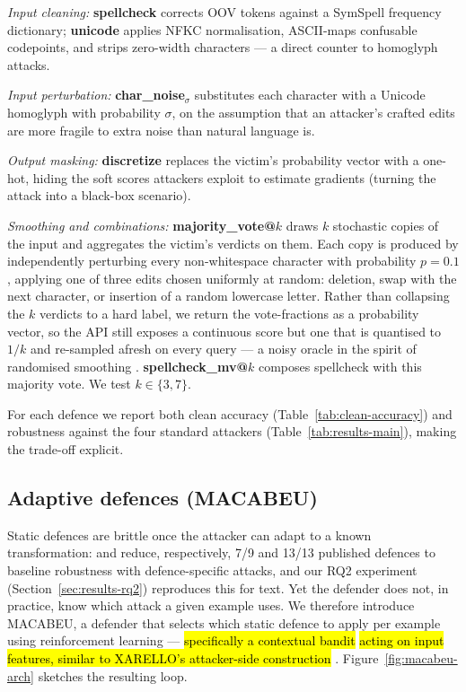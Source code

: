 \documentclass[11pt]{article}
\begin{document}
\emph{Input cleaning:} \textbf{spellcheck} corrects OOV tokens against a SymSpell frequency dictionary; \textbf{unicode} applies NFKC normalisation, ASCII-maps confusable codepoints, and strips zero-width characters --- a direct counter to homoglyph attacks.

\emph{Input perturbation:} \textbf{char\_noise}$_\sigma$ substitutes each character with a Unicode homoglyph with probability $\sigma$, on the assumption that an attacker's crafted edits are more fragile to extra noise than natural language is.

\emph{Output masking:} \textbf{discretize} replaces the victim's probability vector with a one-hot, hiding the soft scores attackers exploit to estimate gradients (turning the attack into a black-box scenario).


\emph{Smoothing and combinations:} \textbf{majority\_vote@$k$} draws $k$ stochastic copies of the input and aggregates the victim's verdicts on them. Each copy is produced by independently perturbing every non-whitespace character with probability $p{=}0.1$, applying one of three edits chosen uniformly at random: deletion, swap with the next character, or insertion of a random lowercase letter. Rather than collapsing the $k$ verdicts to a hard label, we return the vote-fractions as a probability vector, so the API still exposes a continuous score but one that is quantised to $1/k$ and re-sampled afresh on every query --- a noisy oracle in the spirit of randomised smoothing \citep{Ye2020safer}. \textbf{spellcheck\_mv@$k$} composes spellcheck with this majority vote. We test $k \in \{3, 7\}$.

For each defence we report both clean accuracy (Table~\ref{tab:clean-accuracy}) and robustness against the four standard attackers (Table~\ref{tab:results-main}), making the trade-off explicit.




\subsection{Adaptive defences (MACABEU)}
\label{sec:macabeu}
Static defences are brittle once the attacker can adapt to a known transformation: \citet{Athalye2018} and \citet{Tramer2020} reduce, respectively, 7/9 and 13/13 published defences to baseline robustness with defence-specific attacks, and our RQ2 experiment (Section~\ref{sec:results-rq2}) reproduces this for text. Yet the defender does not, in practice, know which attack a given example uses. We therefore introduce MACABEU, a defender that selects which static defence to apply per example using reinforcement learning \citep{SuttonBarto2018} --- \hl{specifically a contextual bandit} \citep{LiContextualBandit2010} \hl{acting on input features, similar to XARELLO's attacker-side construction} \citep{przybyla-etal-2024-know}. Figure~\ref{fig:macabeu-arch} sketches the resulting loop.
\end{document}
